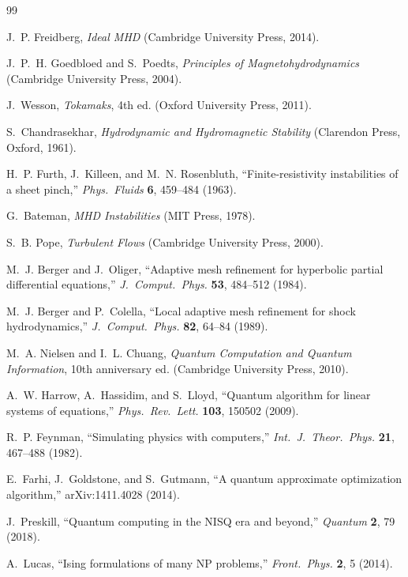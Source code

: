 \documentclass[12pt, a4paper, oneside]{report}
\begin{document}
\begin{thebibliography}{99}

J.~P. Freidberg, \textit{Ideal MHD} (Cambridge University Press, 2014).

J.~P.~H. Goedbloed and S.~Poedts, \textit{Principles of Magnetohydrodynamics} (Cambridge University Press, 2004).

J.~Wesson, \textit{Tokamaks}, 4th ed. (Oxford University Press, 2011).

S.~Chandrasekhar, \textit{Hydrodynamic and Hydromagnetic Stability} (Clarendon Press, Oxford, 1961).

H.~P. Furth, J.~Killeen, and M.~N. Rosenbluth, ``Finite-resistivity instabilities of a sheet pinch,'' \textit{Phys.\ Fluids} \textbf{6}, 459--484 (1963).

G.~Bateman, \textit{MHD Instabilities} (MIT Press, 1978).

S.~B. Pope, \textit{Turbulent Flows} (Cambridge University Press, 2000).

M.~J. Berger and J.~Oliger, ``Adaptive mesh refinement for hyperbolic partial differential equations,'' \textit{J.\ Comput.\ Phys.} \textbf{53}, 484--512 (1984).

M.~J. Berger and P.~Colella, ``Local adaptive mesh refinement for shock hydrodynamics,'' \textit{J.\ Comput.\ Phys.} \textbf{82}, 64--84 (1989).

M.~A. Nielsen and I.~L. Chuang, \textit{Quantum Computation and Quantum Information}, 10th anniversary ed. (Cambridge University Press, 2010).

A.~W. Harrow, A.~Hassidim, and S.~Lloyd, ``Quantum algorithm for linear systems of equations,'' \textit{Phys.\ Rev.\ Lett.} \textbf{103}, 150502 (2009).

R.~P. Feynman, ``Simulating physics with computers,'' \textit{Int.\ J.\ Theor.\ Phys.} \textbf{21}, 467--488 (1982).

E.~Farhi, J.~Goldstone, and S.~Gutmann, ``A quantum approximate optimization algorithm,'' arXiv:1411.4028 (2014).

J.~Preskill, ``Quantum computing in the NISQ era and beyond,'' \textit{Quantum} \textbf{2}, 79 (2018).

A.~Lucas, ``Ising formulations of many NP problems,'' \textit{Front.\ Phys.} \textbf{2}, 5 (2014).


\end{thebibliography}
\end{document}
